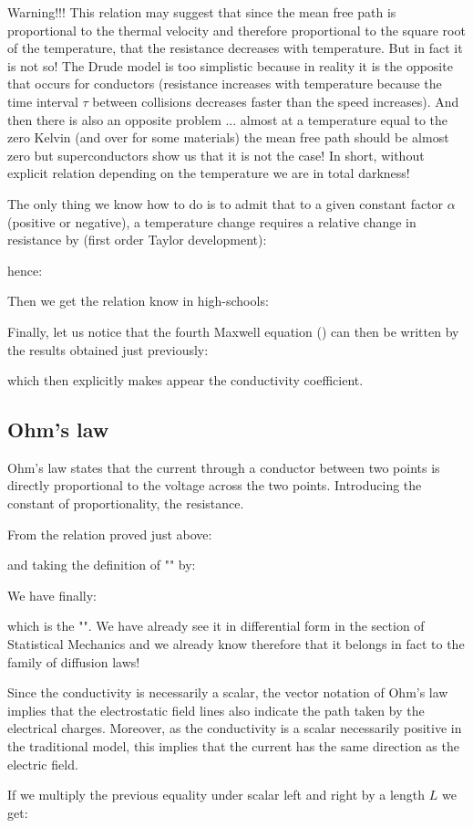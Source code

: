 	Warning!!! This relation may suggest that since the mean free path is proportional to the thermal velocity and therefore proportional to the square root of the temperature, that the resistance decreases with temperature. But in fact it is not so! The Drude model is too simplistic because in reality it is the opposite that occurs for conductors (resistance increases with temperature because the time interval $\tau$ between collisions decreases faster than the speed increases). And then there is also an opposite problem ... almost at a temperature equal to the zero Kelvin (and over for some materials) the mean free path should be almost zero but superconductors show us that it is not the case! In short, without explicit relation depending on the temperature we are in total darkness!
	
	The only thing we know how to do is to admit that to a given constant factor $\alpha$ (positive or negative), a temperature change requires a relative change in resistance by (first order Taylor development):
	
	hence:
	
	Then we get the relation know in high-schools:
	
	Finally, let us notice that the fourth Maxwell equation () can then be written by  the results obtained just previously:
	
	which then explicitly makes appear the conductivity coefficient.
	
	\pagebreak
	\subsection{Ohm's law}\label{ohm law}
	Ohm's law states that the current through a conductor between two points is directly proportional to the voltage across the two points. Introducing the constant of proportionality, the resistance.
	
	From the relation proved just above:
	
	and taking the definition of "" by:
	
	We have finally:
	
	which is the "". We have already see it in differential form in the section of Statistical Mechanics and we already know therefore that it belongs in fact to the family of diffusion laws!
	\begin{tcolorbox}[title=Remark,colframe=black,arc=10pt]
	Since the conductivity is necessarily a scalar, the vector notation of Ohm's law implies that the electrostatic field lines also indicate the path taken by the electrical charges. Moreover, as the conductivity is a scalar necessarily positive in the traditional model, this implies that the current has the same direction as the electric field.
	\end{tcolorbox}	
	If we multiply the previous equality under scalar left and right by a length $L$ we get:
	
